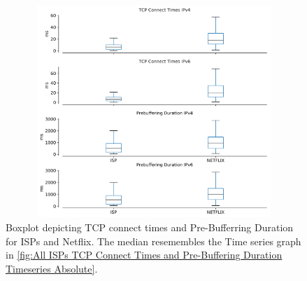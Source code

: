 \begin{figure}[!ht]
	\centering
	\includegraphics[keepaspectratio, height=8cm, width=15cm]{figures/cache/allisps/netflix-tcp-prebuffering-delay-boxplot-isps-seprate.pdf}
	\caption[ALL ISPs TCP Connect Times and Pre-Buffering Duration Boxplot Absolute]{Boxplot depicting TCP connect times and Pre-Bufferring Duration for ISPs and Netflix. The median resemembles the Time series graph in \cref{fig:All ISPs TCP Connect Times and Pre-Buffering Duration Timeseries Absolute}.}
	\label{fig:ALL ISPs TCP Connect Times and Pre-Buffering Duration Boxplot Absolute}
\end{figure}

